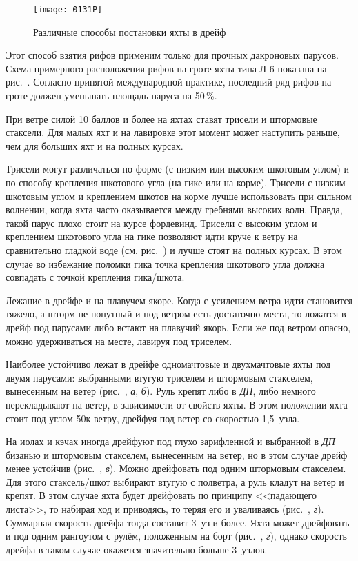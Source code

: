\begin{figure*}[htb]
  \centering{}
  \texttt{[image: 0131P]}
  \caption{Различные способы постановки яхты в дрейф}
  \label{fig:131}
\end{figure*}

Этот способ взятия рифов применим только для прочных дакроновых парусов. Схема примерного расположения рифов на гроте яхты типа Л-6 показана на рис.~. Согласно принятой международной практике, последний ряд рифов на гроте должен уменьшать площадь паруса на 50\,\%. 

При ветре силой 10 баллов и более на яхтах ставят трисели и штормовые стаксели. Для малых яхт и на лавировке этот момент может наступить раньше, чем для больших яхт и на полных курсах. 

Трисели могут различаться по форме (с низким или высоким шкотовым углом) и по способу крепления шкотового угла (на гике или на корме). Трисели с низким шкотовым углом и креплением шкотов на корме лучше использовать при сильном волнении, когда яхта часто оказывается между гребнями высоких волн. Правда, такой парус плохо стоит на курсе фордевинд. Трисели с высоким углом и креплением шкотового угла на гике позволяют идти круче к ветру на сравнительно гладкой воде (см. рис.~) и лучше стоят на полных курсах. В этом случае во избежание поломки гика точка крепления шкотового угла должна совпадать с точкой крепления гика\-/шкота.

Лежание в дрейфе и на плавучем якоре. Когда с усилением ветра идти становится тяжело, а шторм не попутный и под ветром есть достаточно места, то ложатся в дрейф под парусами либо встают на плавучий якорь. Если же под ветром опасно, можно удерживаться на месте, лавируя под триселем.

Наиболее устойчиво лежат в дрейфе одномачтовые и двухмачтовые яхты под двумя парусами: выбранными втугую триселем и штормовым стакселем, вынесенным на ветер (рис.~, \textit{а}, \textit{б}). Руль крепят либо в \textit{ДП}, либо немного перекладывают на ветер, в зависимости от свойств яхты. В этом положении яхта стоит под углом 50\gr к ветру, дрейфуя под ветер со скоростью 1,5~узла. 

На иолах и кэчах иногда дрейфуют под глухо зарифленной и выбранной в \textit{ДП} бизанью и штормовым стакселем, вынесенным на ветер, но в этом случае дрейф менее устойчив (рис.~, \textit{в}). Можно дрейфовать под одним штормовым стакселем. Для этого стаксель\-/шкот выбирают втугую с полветра, а руль кладут на ветер и крепят. В этом случае яхта будет дрейфовать по принципу <<падающего листа>>, то набирая ход и приводясь, то теряя его и уваливаясь (рис.~, \textit{г}). Суммарная скорость дрейфа тогда составит 3~уз и более. Яхта может дрейфовать и под одним рангоутом с рулём, положенным на борт (рис.~, \textit{г}), однако скорость дрейфа в таком случае окажется значительно больше 3~узлов.

